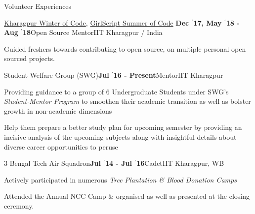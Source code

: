 \documentclass{resume} %
\begin{document}
\begin{rSection}{Volunteer Experiences}

\begin{rSubsection}{\large \href{https://kwoc.kossiitkgp.in/}{Kharagpur Winter of Code}, \href{https://gssoc.tech/projects.html\#facebook-archive}{GirlScript Summer of Code}}{\textbf{ Dec $^{\prime}$17, May $^{\prime}$18 - Aug $^{\prime}$18}}{Open Source Mentor}{IIT Kharagpur / India}
\item Guided freshers towards contributing to open source, on multiple personal open sourced projects.
\end{rSubsection}

\begin{rSubsection}{\large Student Welfare Group (SWG)}{\textbf{\large Jul $^{\prime}$16 - Present}}{Mentor}{IIT Kharagpur}
\item Providing guidance to a group of 6 Undergraduate Students under SWG's \textit{Student-Mentor Program} to smoothen their academic transition as well as bolster growth in non-academic dimensions
\item Help them prepare a better study plan for upcoming semester by providing an incisive analysis of the upcoming subjects along with insightful details about diverse career opportunities to peruse
\end{rSubsection}

\begin{rSubsection}{\large 3 Bengal Tech Air Squadron}{\textbf{\large Jul $^{\prime}$14 - Jul $^{\prime}$16}}{Cadet}{IIT Kharagpur, WB}
\item Actively participated in numerous \textit{Tree Plantation \& Blood Donation Camps}
\item Attended the Annual NCC Camp \& organised as well as presented at the closing ceremony.
\end{rSubsection}



\end{rSection}

\end{document}
